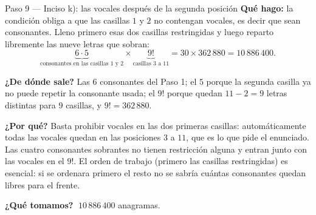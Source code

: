 \documentclass[11pt]{article}
\begin{document}
\begin{paso}{Paso 9 --- Inciso k): las vocales después de la segunda posición}
\textbf{Qué hago:} la condición obliga a que las casillas $1$ y $2$ no contengan vocales, es decir que
sean consonantes. Lleno primero esas dos casillas restringidas y luego reparto libremente las nueve letras
que sobran:
\[
\underbrace{6\cdot5}_{\text{consonantes en las casillas 1 y 2}}\times\underbrace{9!}_{\text{casillas 3 a 11}}
=30\times362\,880=10\,886\,400 .
\]

\textbf{¿De dónde sale?} Las $6$ consonantes del Paso 1; el $5$ porque la segunda casilla ya no puede
repetir la consonante usada; el $9!$ porque quedan $11-2=9$ letras distintas para $9$ casillas, y
$9!=362\,880$.

\textbf{¿Por qué?} Basta prohibir vocales en las dos primeras casillas: automáticamente todas las vocales
quedan en las posiciones $3$ a $11$, que es lo que pide el enunciado. Las cuatro consonantes sobrantes no
tienen restricción alguna y entran junto con las vocales en el $9!$. El orden de trabajo (primero las
casillas restringidas) es esencial: si se ordenara primero el resto no se sabría cuántas consonantes
quedan libres para el frente.

\textbf{¿Qué tomamos?} $\;10\,886\,400$ anagramas.
\end{paso}
\end{document}
